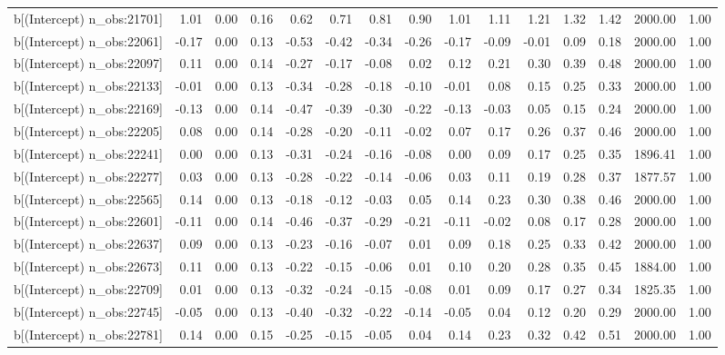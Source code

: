 \begin{table}[ht]
\begin{tabular}{rrrrrrrrrrrrrrr}
  b[(Intercept) n\_obs:21701] & 1.01 & 0.00 & 0.16 & 0.62 & 0.71 & 0.81 & 0.90 & 1.01 & 1.11 & 1.21 & 1.32 & 1.42 & 2000.00 & 1.00 \\ 
  b[(Intercept) n\_obs:22061] & -0.17 & 0.00 & 0.13 & -0.53 & -0.42 & -0.34 & -0.26 & -0.17 & -0.09 & -0.01 & 0.09 & 0.18 & 2000.00 & 1.00 \\ 
  b[(Intercept) n\_obs:22097] & 0.11 & 0.00 & 0.14 & -0.27 & -0.17 & -0.08 & 0.02 & 0.12 & 0.21 & 0.30 & 0.39 & 0.48 & 2000.00 & 1.00 \\ 
  b[(Intercept) n\_obs:22133] & -0.01 & 0.00 & 0.13 & -0.34 & -0.28 & -0.18 & -0.10 & -0.01 & 0.08 & 0.15 & 0.25 & 0.33 & 2000.00 & 1.00 \\ 
  b[(Intercept) n\_obs:22169] & -0.13 & 0.00 & 0.14 & -0.47 & -0.39 & -0.30 & -0.22 & -0.13 & -0.03 & 0.05 & 0.15 & 0.24 & 2000.00 & 1.00 \\ 
  b[(Intercept) n\_obs:22205] & 0.08 & 0.00 & 0.14 & -0.28 & -0.20 & -0.11 & -0.02 & 0.07 & 0.17 & 0.26 & 0.37 & 0.46 & 2000.00 & 1.00 \\ 
  b[(Intercept) n\_obs:22241] & 0.00 & 0.00 & 0.13 & -0.31 & -0.24 & -0.16 & -0.08 & 0.00 & 0.09 & 0.17 & 0.25 & 0.35 & 1896.41 & 1.00 \\ 
  b[(Intercept) n\_obs:22277] & 0.03 & 0.00 & 0.13 & -0.28 & -0.22 & -0.14 & -0.06 & 0.03 & 0.11 & 0.19 & 0.28 & 0.37 & 1877.57 & 1.00 \\ 
  b[(Intercept) n\_obs:22565] & 0.14 & 0.00 & 0.13 & -0.18 & -0.12 & -0.03 & 0.05 & 0.14 & 0.23 & 0.30 & 0.38 & 0.46 & 2000.00 & 1.00 \\ 
  b[(Intercept) n\_obs:22601] & -0.11 & 0.00 & 0.14 & -0.46 & -0.37 & -0.29 & -0.21 & -0.11 & -0.02 & 0.08 & 0.17 & 0.28 & 2000.00 & 1.00 \\ 
  b[(Intercept) n\_obs:22637] & 0.09 & 0.00 & 0.13 & -0.23 & -0.16 & -0.07 & 0.01 & 0.09 & 0.18 & 0.25 & 0.33 & 0.42 & 2000.00 & 1.00 \\ 
  b[(Intercept) n\_obs:22673] & 0.11 & 0.00 & 0.13 & -0.22 & -0.15 & -0.06 & 0.01 & 0.10 & 0.20 & 0.28 & 0.35 & 0.45 & 1884.00 & 1.00 \\ 
  b[(Intercept) n\_obs:22709] & 0.01 & 0.00 & 0.13 & -0.32 & -0.24 & -0.15 & -0.08 & 0.01 & 0.09 & 0.17 & 0.27 & 0.34 & 1825.35 & 1.00 \\ 
  b[(Intercept) n\_obs:22745] & -0.05 & 0.00 & 0.13 & -0.40 & -0.32 & -0.22 & -0.14 & -0.05 & 0.04 & 0.12 & 0.20 & 0.29 & 2000.00 & 1.00 \\ 
  b[(Intercept) n\_obs:22781] & 0.14 & 0.00 & 0.15 & -0.25 & -0.15 & -0.05 & 0.04 & 0.14 & 0.23 & 0.32 & 0.42 & 0.51 & 2000.00 & 1.00 \\ 

\end{tabular}
\end{table}
